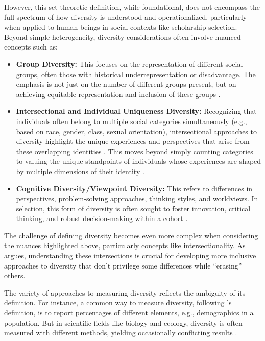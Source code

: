 However, this set-theoretic definition, while foundational, does not encompass the full spectrum of how diversity is understood and operationalized, particularly when applied to human beings in social contexts like scholarship selection. Beyond simple heterogeneity, diversity considerations often involve nuanced concepts such as:
\begin{itemize}
    \item \textbf{Group Diversity:} This focuses on the representation of different social groups, often those with historical underrepresentation or disadvantage. The emphasis is not just on the number of different groups present, but on achieving equitable representation and inclusion of these groups \cite{Mitchell_Diversity_2020,Stirling_General_2007}.
    \item \textbf{Intersectional and Individual Uniqueness Diversity:} Recognizing that individuals often belong to multiple social categories simultaneously (e.g., based on race, gender, class, sexual orientation), intersectional approaches to diversity highlight the unique experiences and perspectives that arise from these overlapping identities \cite{Mitchell_Diversity_2020}. This moves beyond simply counting categories to valuing the unique standpoints of individuals whose experiences are shaped by multiple dimensions of their identity \cite{Crenshaw_Demarginalizing_1989}.
    \item \textbf{Cognitive Diversity/Viewpoint Diversity:} This refers to differences in perspectives, problem-solving approaches, thinking styles, and worldviews. In selection, this form of diversity is often sought to foster innovation, critical thinking, and robust decision-making within a cohort \cite{Hong_Page_2004_Diversity}.
\end{itemize}

The challenge of defining diversity becomes even more complex when considering the nuances highlighted above, particularly concepts like intersectionality. As \textcite{Crenshaw_Demarginalizing_1989} argues, understanding these intersections is crucial for developing more inclusive approaches to diversity that don't privilege some differences while ``erasing'' others.

The variety of approaches to measuring diversity reflects the ambiguity of its definition. For instance, a common way to measure diversity, following \textcite{page_diversity_2010}'s definition, is to report percentages of different elements, e.g., demographics in a population. But in scientific fields like biology and ecology, diversity is often measured with different methods, yielding occasionally conflicting results \cite{xu2020diversity}.

